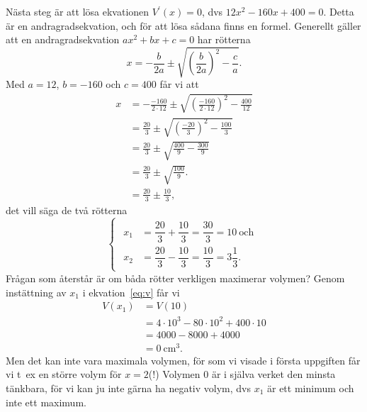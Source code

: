 \documentclass[a4paper,12pt]{article}
\begin{document}
Nästa steg är att lösa ekvationen $V^\prime(x) = 0$, dvs $12x^2 - 160x +
400 = 0$. Detta är en andragradsekvation, och för att lösa sådana
finns en formel. Generellt gäller att en andragradsekvation
$ax^2 + bx + c = 0$ har rötterna 
%
\begin{displaymath}
  x = -\frac{b}{2a}
      \pm
      \sqrt{\left(\frac{b}{2a}\right)^2 - \frac{c}{a}}.
\end{displaymath}
%
Med $a = 12$, $b = -160$ och $c = 400$ får vi att
%
\begin{align*}
  x   &= -\frac{-160}{2 \cdot 12}
          \pm
          \sqrt{\left(\frac{-160}{2 \cdot 12}\right)^2 - \frac{400}{12}} \\
%
      &=  \frac{20}{3}
          \pm
          \sqrt{\left(\frac{-20}{3}\right)^2 - \frac{100}{3}} \\
%
      &=  \frac{20}{3}
          \pm
          \sqrt{\frac{400}{9} - \frac{300}{9}} \\
%
      &=  \frac{20}{3}
          \pm
          \sqrt{\frac{100}{9}}. \\
%
      &=  \frac{20}{3}
          \pm
          \frac{10}{3},
\end{align*}
% 
det vill säga de två rötterna
%
\begin{displaymath}
%
  \begin{cases}
%
    \begin{aligned}
      x_1 &= \dfrac{20}{3} + \dfrac{10}{3}
           = \dfrac{3 0}{3}
           = 10~\text{och}\\
%
      x_2 &= \dfrac{20}{3} - \dfrac{10}{3}
           = \dfrac{10}{3}
           = 3\dfrac{1}{3}.
    \end{aligned}
%
  \end{cases}
%
\end{displaymath}
%
Frågan som återstår är om båda rötter verkligen maximerar volymen?
Genom instättning av $x_1$ i ekvation~\ref{eq:v} får vi
%
\begin{align*}
  V(x_1) &= V(10) \\
         &= 4 \cdot 10^3 - 80 \cdot 10^2 + 400 \cdot 10 \\
         &= 4000         - 8000          + 4000 \\
         &= 0~\text{cm}^3. 
\end{align*}
%
Men det kan inte vara maximala volymen, för som vi visade i första
uppgiften får vi t~ex en större volym för $x = 2$(!) Volymen 0 är
i själva verket den minsta tänkbara, för vi kan ju inte gärna ha negativ
volym, dvs $x_1$ är ett minimum och inte ett maximum. 
\end{document}
